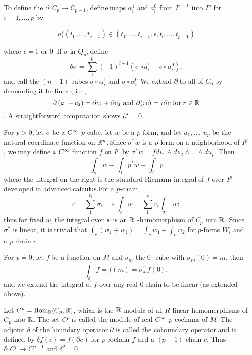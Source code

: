 \documentclass[../main]{subfiles}
\begin{document}
To define the  $\partial: C_{p} \rightarrow C_{p-1}$, define maps $\alpha_{i}^{1}$ and $a_{i}^{0}$ from $I^{p-1}$ into $I^{p}$ for $i=1, \ldots, p$ by

\begin{equation}\tag{16}\label{eq:ch07.16}
a_{i}^{\varepsilon}\left(t_{1}, \ldots, t_{p-1}\right) \in\left(t_{1}, \ldots, t_{i-1}, \epsilon, t_{i}, \ldots, t_{p-1}\right)
\end{equation}

where $\epsilon=1$ or 0. If $\sigma$ in $Q_{p}$, define \[\partial \sigma=\sum_{1}^{p}(-1)^{i+1}\left(\sigma \circ a_{i}^{1}-\sigma \circ a_{i}^{0}\right),\] and call the $(n-1)$-cubes $\sigma \circ \alpha_{i}^{1}$ and $\sigma \circ \alpha_{i}^{0}$  We extend $\partial$ to all of $C_{p}$ by demanding it be linear, i.e., \[\partial\left(c_{1}+c_{2}\right)=\partial c_{1}+\partial c_{2}\text{ and }\partial(r c)=r \partial c \text{ for }r \in\mathbb{R}\]. A straightforward computation shows $\partial^{2}=0$. 

For $p>0$, let $\sigma$ be a $C^\infty$ $p$-cube, let $w$ be a $p$-form, and let $u_{1}, \ldots$, $u_{p}$ be the natural coordinate function on $\mathbb{R}^{p}$. Since $\sigma^\ast w$ is a $p$-form on a neighborhood of $I^{p}$, we may define a $C^\infty$ function $f$ on $I^{p}$ by $\sigma^\ast w=f d u_{1} \wedge d u_{2} \wedge \ldots \wedge d u_{p}$. Then
\[\tag{17}\label{eq:ch07.17}
\int_{\sigma} w \equiv \int_{I} p^\ast w \equiv \int_{I} p
\]
where the integral on the right is the standard Riemann integral of $f$ over $I^{p}$ developed in advanced calculus.For a $p$-chain \[c=\sum_{1}^{k_{i}} \sigma_{i} \implies \int_{c} w=\sum_{1}^k r_i \int_{\sigma_{i}} w;\]thus for fixed $w$, the integral over $w$ is an $\mathbb{R}$ -homomorphism of $C_{p}$ into $\mathbb{R}$. Since $\sigma^\ast$ is linear, it is trivial that $\int_{c}\left(w_{1}+w_{2}\right)=\int_c w_{1}+\int_{c} w_{2}$ for $p$-forms $W_{i}$ and a $p$-chain $c$.

For $p=0$, let $f$ be a function on $M$ and $\sigma_{m}$ the 0 -cube with $\sigma_{m}(0)=m$, then \[\int_{\sigma} f=f(m)=\sigma_{m}^\ast f(0),\] and we extend the integral of $f$ over any real $0$-chain to be linear (as extended above).

Let $C^{p} = \mathrm{Hom}_{\mathbb{R}}(C_{p}, \mathbb{R})$, which is the $\mathbb{R}$-module of all $R$-linear homomorphisms of $C_{p}$ into $\mathbb{R}$. The set $C^{p}$ is called the module of real $C^\infty$ $p$-cochains of $M$. The adjoint $\delta$ of the boundary operator $\partial$ is called the coboundary operator and is defined by $\delta f(c)=f(\partial c)$ for $p$-cochain $f$ and a $(p+1)$-chain $c$. Thus $\delta: C^{p} \rightarrow C^{p+1}$ and $\delta^{2}=0$.
\end{document}
